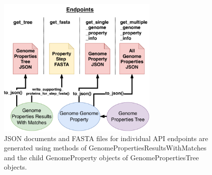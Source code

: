 \begin{figure}[!ht]
  \centering
	\includegraphics[width=0.70\textwidth]{media/Micromeda-Endpoints.pdf}
	 \caption{JSON documents and FASTA files for individual API endpoints are generated using methods of GenomePropertiesResultsWithMatches and the child GenomeProperty objects of GenomePropertiesTree objects.}
	 \label{fig:micromeda-endpoints}
\end{figure}

